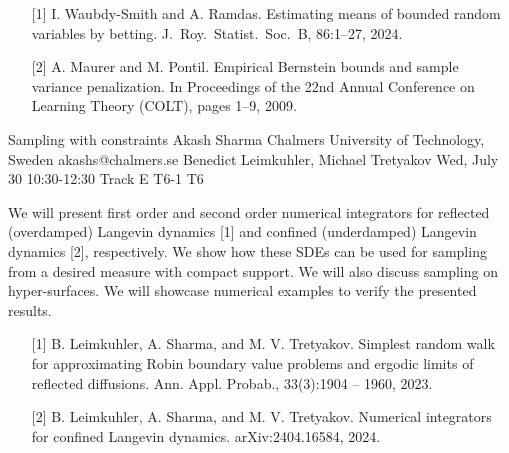 \begin{talk}
\begin{enumerate}
	\item[{[1]}] I. Waubdy-Smith and A. Ramdas. Estimating means of bounded random
variables by betting. J.\ Roy.\ Statist.\ Soc.\ B, 86:1–27, 2024.
	\item[{[2]}] A. Maurer and M. Pontil. Empirical Bernstein bounds and sample variance penalization. In Proceedings of the 22nd Annual Conference
on Learning Theory (COLT), pages 1–9, 2009.
\end{enumerate}


\end{talk}
\begin{talk}
  {Sampling with constraints}%
  {Akash Sharma}%
  {Chalmers University of Technology, Sweden}%
  {akashs@chalmers.se}%
  {Benedict Leimkuhler, Michael Tretyakov}%
  {}%
  {Wed, July 30 10:30-12:30 Track E}%
  {T6-1}%
  {T6}%
			
 We will present first order and second order numerical integrators for reflected (overdamped) Langevin dynamics [1] and confined (underdamped) Langevin dynamics [2], respectively. We show how these SDEs can be used for sampling from a desired measure with compact support. We will also discuss sampling on hyper-surfaces. We will showcase numerical examples to verify the presented results.  

\medskip  

\begin{enumerate}
	\item[{[1]}] B. Leimkuhler, A. Sharma, and M. V. Tretyakov. Simplest random walk for approximating Robin boundary
value problems and ergodic limits of reflected diffusions. Ann. Appl. Probab., 33(3):1904 – 1960, 2023.
	\item[{[2]}] B. Leimkuhler, A. Sharma, and M. V. Tretyakov. Numerical integrators for confined Langevin dynamics.  
arXiv:2404.16584, 2024.
\end{enumerate}


\end{talk}
